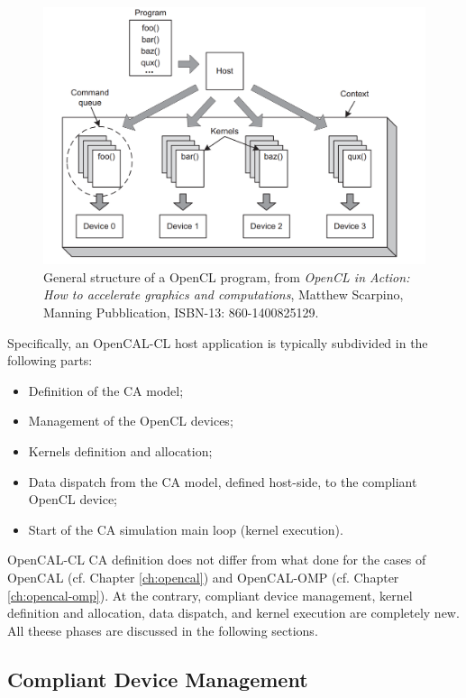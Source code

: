 \begin{figure}[htp]
  \begin{center}
    \includegraphics[width=12cm]{./images/OpenCAL-CL/kernelDistribution}
    \caption{General structure of a OpenCL program, from \emph{OpenCL
        in Action: How to accelerate graphics and computations},
      Matthew Scarpino, Manning Pubblication, ISBN-13:
      860-1400825129.}
    \label{fig:GeneralStructure}
  \end{center}
\end{figure}

Specifically, an OpenCAL-CL host application is typically
subdivided in the following parts:
\begin{itemize}
\item Definition of the CA model;
\item Management of the OpenCL devices;
\item Kernels definition and allocation;
\item Data dispatch from the CA model, defined host-side, to the compliant OpenCL device;
\item Start of the CA simulation main loop (kernel execution).
\end{itemize}

OpenCAL-CL CA definition does not differ from what done for the cases
of OpenCAL (cf. Chapter \ref{ch:opencal}) and OpenCAL-OMP (cf. Chapter
\ref{ch:opencal-omp}). At the contrary, compliant device management,
kernel definition and allocation, data dispatch, and kernel execution
are completely new. All theese phases are discussed in the following
sections.

\subsection{Compliant Device Management}

